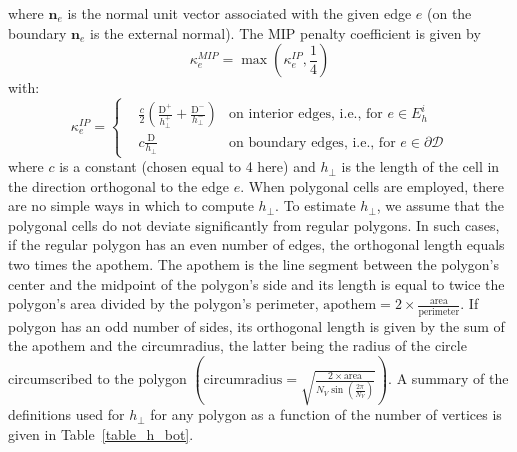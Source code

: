 \documentclass[preprint,10pt]{elsarticle}
\newcommand\bn{\boldsymbol{\nabla}}
\newcommand\bo{\boldsymbol{\Omega}}
\newcommand\bs{\boldsymbol}
\newcommand\mc{\mathcal}
\renewcommand{\(}{\left(}
\renewcommand{\)}{\right)}
\renewcommand{\[}{\left[}
\renewcommand{\]}{\right]}
\begin{document}
where $\bs{n}_e$ is the normal unit vector associated with the given edge $e$
(on the boundary $\bs{n}_e$ is the external normal).
%
The MIP penalty coefficient is given by
\begin{equation}
\kappa_e^{MIP} = \max\(\kappa_e^{IP},\frac{1}{4}\)
\end{equation}
with:
\begin{equation}
\kappa_e^{IP} = \left\{
\begin{aligned}
&\frac{c}{2} \left( \frac{\mathrm{D^+}}{h_{\bot}^+} + \frac{\mathrm{D}^-}{h_{\bot}^-} \right) & \textrm{on interior edges, i.e., for }
e\in E_h^i\\
&c \frac{\mathrm{D}}{h_{\bot}} & \textrm{on boundary edges, i.e., for } e
\in\partial \mc{D} %
\end{aligned}
\right. 
\end{equation}
where $c$ is a constant (chosen equal to 4 here) and $h_{\bot}$ is the length of the cell in the direction
orthogonal to the edge $e$. 
%
%
When polygonal cells are employed, there are no 
simple ways in which to compute $h_{\bot}$. To estimate $h_{\bot}$, we 
assume that the polygonal cells do not deviate significantly from regular polygons. 
In such cases, if the regular polygon has an even number of edges, the orthogonal 
length equals two times the apothem. The apothem is the line segment between the 
polygon's center and the midpoint of the polygon's side and its length is equal to
twice the polygon's area divided by the polygon's perimeter,
$\textrm{apothem}=2\times \tfrac{\textrm{area}}{\textrm{perimeter}}$. 
If polygon has an odd number of sides, its orthogonal length is given by the sum of the
apothem and the circumradius, the latter being the radius of the circle circumscribed to 
the polygon $\(\textrm{circumradius}=\sqrt{\tfrac{2\times \textrm{area}}{N_V
\sin\(\frac{2\pi}{N_V}\)}}\)$. A summary of the definitions used for $h_{\bot}$ for 
any polygon as a function of the number of vertices is given in
Table~\ref {table_h_bot}.
%
\end{document}
